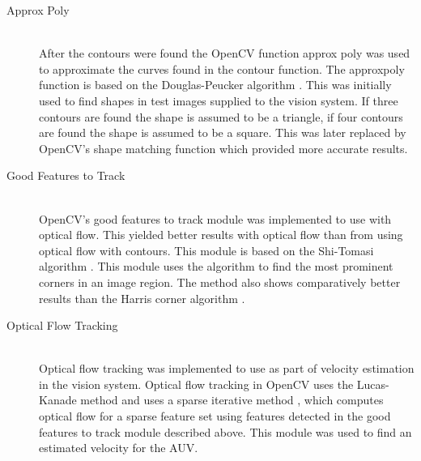\begin{description}
\item[Approx Poly]\hfill \\
After the contours were found the OpenCV function approx poly was used to approximate the curves found in the contour function. The approxpoly function is based on the Douglas-Peucker algorithm \cite{article:douglas}. This was initially used to find shapes in test images supplied to the vision system. If three contours are found the shape is assumed to be a triangle, if four contours are found the shape is assumed to be a square. This was later replaced by OpenCV's shape matching function which provided more accurate results.

\item[Good Features to Track]\hfill \\
OpenCV's good features to track module was implemented to use with optical flow. This yielded better results with optical flow than from using optical flow with contours. This module is based on the Shi-Tomasi algorithm \cite{article:tomasi}. This module uses the algorithm to find the most prominent corners in an image region. The method also shows comparatively better results than the Harris corner algorithm \cite{article:tomasi}.

\item[Optical Flow Tracking]\hfill \\
Optical flow tracking was implemented to use as part of velocity estimation in the vision system. Optical flow tracking in OpenCV uses the Lucas-Kanade method and uses a sparse iterative method \cite{web:opticalFlow}, which computes optical flow for a sparse feature set using features detected in the good features to track module described above. This module was used to find an estimated velocity for the AUV.

\end{description}

